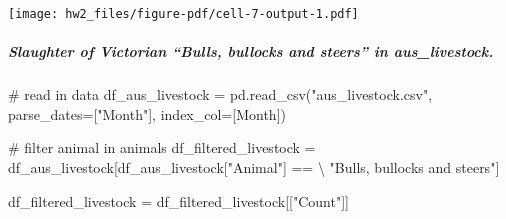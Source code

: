 \documentclass[
  11pt,
]{article}
\let\oldsubparagraph\subparagraph
\renewcommand{\subparagraph}[1]{\oldsubparagraph{#1}\mbox{}}
\newenvironment{Shaded}{\begin{snugshade}}{\end{snugshade}}
\newcommand{\CommentTok}[1]{\textcolor[rgb]{0.37,0.37,0.37}{#1}}
\newcommand{\DecValTok}[1]{\textcolor[rgb]{0.68,0.00,0.00}{#1}}
\newcommand{\NormalTok}[1]{\textcolor[rgb]{0.00,0.23,0.31}{#1}}
\newcommand{\OperatorTok}[1]{\textcolor[rgb]{0.37,0.37,0.37}{#1}}
\newcommand{\StringTok}[1]{\textcolor[rgb]{0.13,0.47,0.30}{#1}}
\begin{document}
\begin{Shaded}
\end{Shaded}

\texttt{[image: hw2\_files/figure-pdf/cell-7-output-1.pdf]}

\subparagraph{Slaughter of Victorian ``Bulls, bullocks and steers'' in
aus\_livestock.}\label{slaughter-of-victorian-bulls-bullocks-and-steers-in-aus_livestock.}

\begin{Shaded}
\begin{Highlighting}[]
\CommentTok{\# read in data}
\NormalTok{df\_aus\_livestock }\OperatorTok{=}\NormalTok{ pd.read\_csv(}\StringTok{"aus\_livestock.csv"}\NormalTok{, }
\NormalTok{                               parse\_dates}\OperatorTok{=}\NormalTok{[}\StringTok{"Month"}\NormalTok{], }
\NormalTok{                               index\_col}\OperatorTok{=}\NormalTok{[}\StringTok{\textquotesingle{}Month\textquotesingle{}}\NormalTok{])}

\CommentTok{\# filter animal in animals}
\NormalTok{df\_filtered\_livestock }\OperatorTok{=}\NormalTok{ df\_aus\_livestock[df\_aus\_livestock[}\StringTok{"Animal"}\NormalTok{] }\OperatorTok{==} \OperatorTok{\textbackslash{}}
  \StringTok{"Bulls, bullocks and steers"}\NormalTok{]}

\NormalTok{df\_filtered\_livestock }\OperatorTok{=}\NormalTok{ df\_filtered\_livestock[[}\StringTok{"Count"}\NormalTok{]]}
\end{Highlighting}
\end{Shaded}
\end{document}
